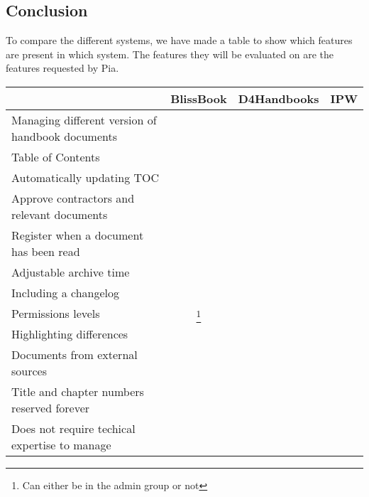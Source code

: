 \subsection{Conclusion}
To compare the different systems, we have made a table to show which features are present in which system. The features they will be evaluated on are the features requested by Pia.
\begin{center}
  \begin{tabular}{| l | c | c | c |}
    \hline
		 & BlissBook & D4Handbooks & IPW \\ \hline
		Managing different version of handbook documents & \checkmark &  &  \\ \hline
		Table of Contents & \checkmark &  &  \\ \hline
		Automatically updating TOC & \checkmark &  &  \\ \hline
		Approve contractors and relevant documents &  &  &  \\ \hline
		Register when a document has been read & \checkmark &  &  \\ \hline
		Adjustable archive time &  &  &  \\ \hline
		Including a changelog & \checkmark &  &  \\ \hline
		Permissions levels & \checkmark\footnote{Can either be in the admin group or not} &  &  \\ \hline
		Highlighting differences & \checkmark &  &  \\ \hline
		Documents from external sources &  &  &  \\ \hline
		Title and chapter numbers reserved forever &  &  &  \\ \hline
		Does not require techical expertise to manage & \checkmark &  &  \\
    \hline
  \end{tabular}
  
\end{center}

